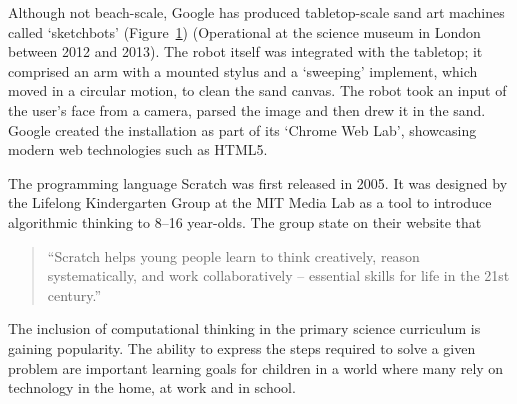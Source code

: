         \begin{figure}
          \begin{center}
          \end{center}
          \caption{}
          \label{fig: sketchbots}
        \end{figure}
        Although not beach-scale, Google has produced tabletop-scale sand art machines called `sketchbots' (Figure~\ref{fig: sketchbots}) (Operational at the science museum in London between 2012 and 2013).\cite{Warman2012} The robot itself was integrated with the tabletop; it comprised an arm with a mounted stylus and a `sweeping' implement, which moved in a circular motion, to clean the sand canvas. The robot took an input of the user's face from a camera, parsed the image and then drew it in the sand. Google  created the installation as part of its `Chrome Web Lab', showcasing modern web technologies such as HTML5.

\label{education review}
    The programming language Scratch was first released in 2005. It was designed by the Lifelong Kindergarten Group at the MIT Media Lab as a tool to introduce algorithmic thinking to 8--16 year-olds.\cite{scratch} The group state on their website that
    \begin{quotation}
        ``Scratch helps young people learn to think creatively, reason systematically, and work collaboratively -- essential skills for life in the 21st century.''
    \end{quotation}
    The inclusion of computational thinking in the primary science curriculum is gaining popularity. The ability to express the steps required to solve a given problem are important learning goals for children in a world where many rely on technology in the home, at work and in school.


